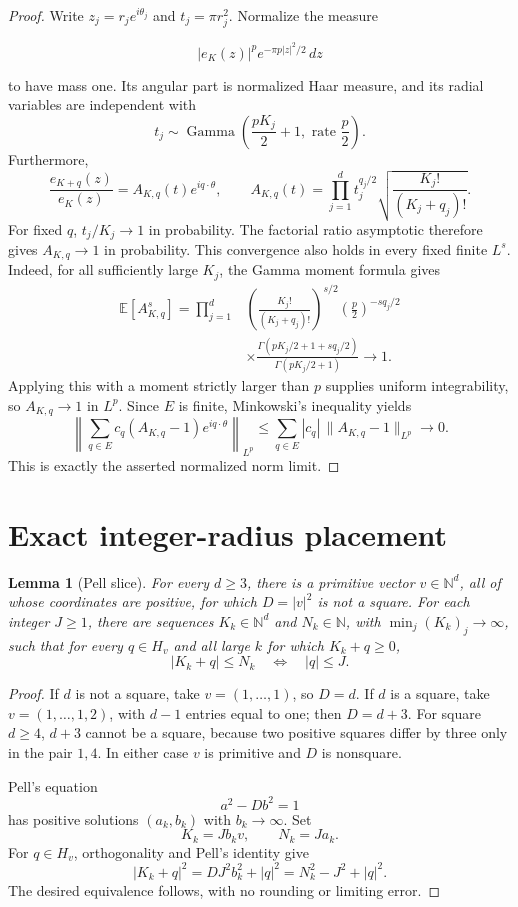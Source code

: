 \documentclass[11pt]{article}
\newtheorem{lemma}{Lemma}
\newcommand{\N}{\mathbb N}
\begin{document}
\begin{proof}
Write $z_j=r_je^{i\theta_j}$ and $t_j=\pi r_j^2$.  Normalize the measure

\[
 |e_K(z)|^p e^{-\pi p|z|^2/2}\,dz
\]

to have mass one.  Its angular part is normalized Haar measure, and its radial
variables are independent with
\[
 t_j\sim\operatorname{Gamma}\left(\frac{pK_j}{2}+1,
                                  \text{ rate }\frac p2\right).
\]
Furthermore,
\[
 \frac{e_{K+q}(z)}{e_K(z)}
 =A_{K,q}(t)e^{iq\cdot\theta},\qquad
 A_{K,q}(t)=\prod_{j=1}^d t_j^{q_j/2}
            \sqrt{\frac{K_j!}{(K_j+q_j)!}}.
\]
For fixed $q$, $t_j/K_j\to1$ in probability.  The factorial ratio
asymptotic therefore gives $A_{K,q}\to1$ in probability.  This convergence
also holds in every fixed finite $L^s$.  Indeed, for all sufficiently large
$K_j$, the Gamma moment formula gives
\begin{align*}
 \mathbb E[A_{K,q}^{s}]
 =\prod_{j=1}^d&\left(\frac{K_j!}{(K_j+q_j)!}\right)^{s/2}
 \left(\frac p2\right)^{-sq_j/2}\\
 &\times
 \frac{\Gamma(pK_j/2+1+sq_j/2)}{\Gamma(pK_j/2+1)}
 \longrightarrow1.
\end{align*}
Applying this with a moment strictly larger than $p$ supplies uniform
integrability, so $A_{K,q}\to1$ in $L^p$.  Since $E$ is finite,
Minkowski's inequality yields
\[
 \left\|\sum_{q\in E}c_q(A_{K,q}-1)e^{iq\cdot\theta}\right\|_{L^p}
 \le\sum_{q\in E}|c_q|\,\|A_{K,q}-1\|_{L^p}\longrightarrow0.
\]
This is exactly the asserted normalized norm limit.
\end{proof}

\section*{Exact integer-radius placement}

\begin{lemma}[Pell slice]\label{lem:pell}
For every $d\ge3$, there is a primitive vector $v\in\N^d$, all of whose
coordinates are positive, for which $D=|v|^2$ is not a square.  For each
integer $J\ge1$, there are sequences $K_k\in\N^d$ and $N_k\in\N$, with
$\min_j(K_k)_j\to\infty$, such that for every $q\in H_v$ and all large
$k$ for which $K_k+q\ge0$,
\[
 |K_k+q|\le N_k \quad\Longleftrightarrow\quad |q|\le J.
\]
\end{lemma}

\begin{proof}
If $d$ is not a square, take $v=(1,\ldots,1)$, so $D=d$.  If $d$ is a
square, take $v=(1,\ldots,1,2)$, with $d-1$ entries equal to one; then
$D=d+3$.  For square $d\ge4$, $d+3$ cannot be a square, because two
positive squares differ by three only in the pair $1,4$.  In either case
$v$ is primitive and $D$ is nonsquare.

Pell's equation
\[
 a^2-Db^2=1
\]
has positive solutions $(a_k,b_k)$ with $b_k\to\infty$.  Set
\[
 K_k=Jb_kv,\qquad N_k=Ja_k.
\]
For $q\in H_v$, orthogonality and Pell's identity give
\[
 |K_k+q|^2=DJ^2b_k^2+|q|^2=N_k^2-J^2+|q|^2.
\]
The desired equivalence follows, with no rounding or limiting error.
\end{proof}
\end{document}

